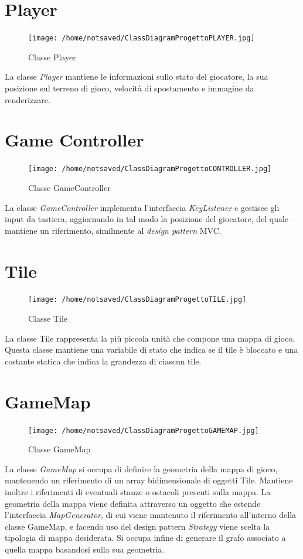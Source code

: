 \documentclass[11pt]{book}
\begin{document}
\section{Player}
\begin{figure}[H]
\centering
\texttt{[image: /home/notsaved/ClassDiagramProgettoPLAYER.jpg]}
\caption{Classe Player}
\label{clssplyr}
\end{figure}

La classe \emph{Player} mantiene le informazioni sullo stato del giocatore, la sua posizione sul terreno di gioco, velocit\`a di spostamento e immagine da renderizzare.

\section{Game Controller}
\begin{figure}[H]
\centering
\texttt{[image: /home/notsaved/ClassDiagramProgettoCONTROLLER.jpg]}
\caption{Classe GameController}
\label{gameController}
\end{figure}

La classe \emph{GameController} implementa l'interfaccia \emph{KeyListener} e gestisce gli input da tastiera, aggiornando in tal modo la posizione del giocatore, del quale mantiene un riferimento, similmente al \emph{design pattern} MVC.

\section{Tile}
\begin{figure}[H]
\centering
\texttt{[image: /home/notsaved/ClassDiagramProgettoTILE.jpg]}
\caption{Classe Tile}
\label{clssTile}
\end{figure}

La classe Tile rappresenta la pi\`u piccola unit\`a che compone una mappa di gioco. Questa classe mantiene una variabile di stato che indica se il tile \`e bloccato e una costante statica che indica la grandezza di ciascun tile.

\section{GameMap}
\begin{figure}[H]
\centering
\texttt{[image: /home/notsaved/ClassDiagramProgettoGAMEMAP.jpg]}
\caption{Classe GameMap}
\label{gamemap}
\end{figure}

La classe \emph{GameMap} si occupa di definire la geometria della mappa di gioco, mantenendo un riferimento di un array bidimensionale di oggetti Tile. Mantiene inoltre i riferimenti di eventuali stanze o ostacoli presenti sulla mappa. La geometria della mappa viene definita attraverso un oggetto che estende l'interfaccia \emph{MapGenerator}, di cui viene mantenuto il riferimento all'interno della classe GameMap, e facendo uso del design pattern \emph{Strategy} viene scelta la tipologia di mappa desiderata. Si occupa infine di generare il grafo associato a quella mappa basandosi sulla sua geometria.
\end{document}

